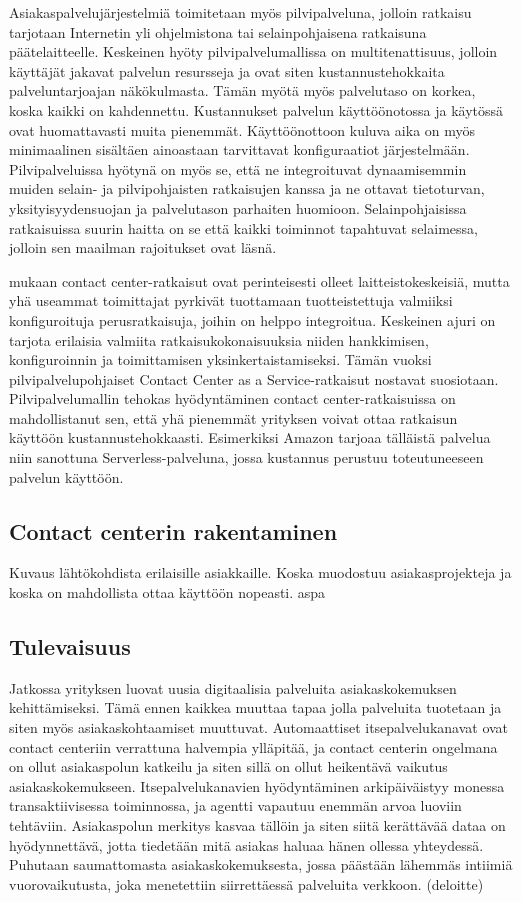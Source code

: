 \documentclass[finnish,12pt,a4paper,pdftex]{article}
\begin{document}
Asiakaspalvelujärjestelmiä toimitetaan myös pilvipalveluna, jolloin ratkaisu tarjotaan Internetin yli ohjelmistona tai selainpohjaisena ratkaisuna päätelaitteelle. Keskeinen hyöty pilvipalvelumallissa on multitenattisuus, jolloin käyttäjät jakavat palvelun resursseja ja ovat siten kustannustehokkaita palveluntarjoajan näkökulmasta. Tämän myötä myös palvelutaso on korkea, koska kaikki on kahdennettu. Kustannukset palvelun käyttöönotossa ja käytössä ovat huomattavasti muita pienemmät. Käyttöönottoon kuluva aika on myös minimaalinen sisältäen ainoastaan tarvittavat konfiguraatiot järjestelmään. Pilvipalveluissa hyötynä on myös se, että ne integroituvat dynaamisemmin muiden selain- ja pilvipohjaisten ratkaisujen kanssa ja ne ottavat tietoturvan, yksityisyydensuojan ja palvelutason parhaiten huomioon. Selainpohjaisissa ratkaisuissa suurin haitta on se että kaikki toiminnot tapahtuvat selaimessa, jolloin sen maailman rajoitukset ovat läsnä. \citep{talkdesk}

\cite{ccgartner} mukaan contact center-ratkaisut ovat perinteisesti olleet laitteistokeskeisiä, mutta yhä useammat toimittajat pyrkivät tuottamaan tuotteistettuja valmiiksi konfiguroituja perusratkaisuja, joihin on helppo integroitua. Keskeinen ajuri on tarjota erilaisia valmiita ratkaisukokonaisuuksia niiden hankkimisen, konfiguroinnin ja toimittamisen yksinkertaistamiseksi. Tämän vuoksi pilvipalvelupohjaiset Contact Center as a Service-ratkaisut nostavat suosiotaan. Pilvipalvelumallin tehokas hyödyntäminen contact center-ratkaisuissa on mahdollistanut sen, että yhä pienemmät yrityksen voivat ottaa ratkaisun käyttöön kustannustehokkaasti. Esimerkiksi Amazon tarjoaa tälläistä palvelua niin sanottuna Serverless-palveluna, jossa kustannus perustuu toteutuneeseen palvelun käyttöön.

\subsection{Contact centerin rakentaminen}

Kuvaus lähtökohdista erilaisille asiakkaille. Koska muodostuu asiakasprojekteja ja koska on mahdollista ottaa käyttöön nopeasti.
aspa
\subsection{Tulevaisuus}

Jatkossa yrityksen luovat uusia digitaalisia palveluita asiakaskokemuksen kehittämiseksi. Tämä ennen kaikkea muuttaa tapaa jolla palveluita tuotetaan ja siten myös asiakaskohtaamiset muuttuvat. Automaattiset itsepalvelukanavat ovat contact centeriin verrattuna halvempia ylläpitää, ja contact centerin ongelmana on ollut asiakaspolun katkeilu ja siten sillä on ollut heikentävä vaikutus asiakaskokemukseen. Itsepalvelukanavien hyödyntäminen arkipäiväistyy monessa transaktiivisessa toiminnossa, ja agentti vapautuu enemmän arvoa luoviin tehtäviin. Asiakaspolun merkitys kasvaa tällöin ja siten siitä kerättävää dataa on hyödynnettävä, jotta tiedetään mitä asiakas haluaa hänen ollessa yhteydessä. Puhutaan saumattomasta asiakaskokemuksesta, jossa päästään lähemmäs intiimiä vuorovaikutusta, joka menetettiin siirrettäessä palveluita verkkoon. (deloitte)
\end{document}
